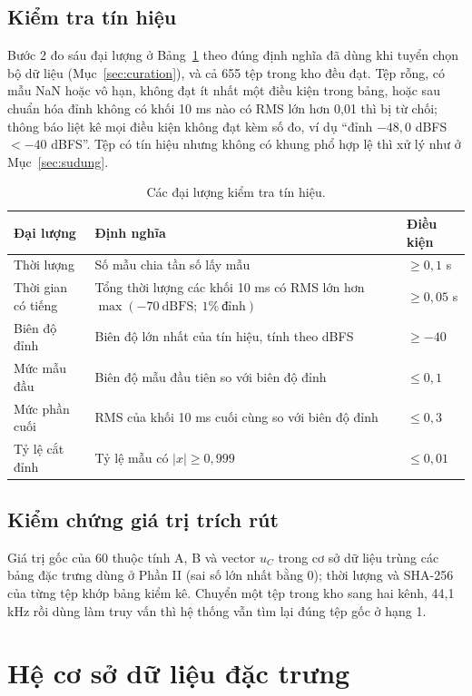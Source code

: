 \documentclass[11pt,a4paper]{article}
\begin{document}
\subsection{Kiểm tra tín hiệu}\label{sec:kiemtratinhieu}
Bước 2 đo sáu đại lượng ở Bảng~\ref{tab:kiemtra} theo đúng định nghĩa đã dùng khi tuyển chọn bộ dữ liệu (Mục~\ref{sec:curation}), và cả 655 tệp trong kho đều đạt. Tệp rỗng, có mẫu NaN hoặc vô hạn, không đạt ít nhất một điều kiện trong bảng, hoặc sau chuẩn hóa đỉnh không có khối 10 ms nào có RMS lớn hơn 0,01 thì bị từ chối; thông báo liệt kê mọi điều kiện không đạt kèm số đo, ví dụ ``đỉnh $-48{,}0$ dBFS $<-40$ dBFS''. Tệp có tín hiệu nhưng không có khung phổ hợp lệ thì xử lý như ở Mục~\ref{sec:sudung}.
\begin{table}[htbp]
\centering\small
\caption{Các đại lượng kiểm tra tín hiệu.}\label{tab:kiemtra}
\begin{tabularx}{\textwidth}{p{}Xl}
\toprule
Đại lượng & Định nghĩa & Điều kiện\\\midrule
Thời lượng & Số mẫu chia tần số lấy mẫu & $\ge 0{,}1$ s\\
Thời gian có tiếng & Tổng thời lượng các khối 10 ms có RMS lớn hơn $\max(-70\ \text{dBFS};\ 1\%\ \text{đỉnh})$ & $\ge 0{,}05$ s\\
Biên độ đỉnh & Biên độ lớn nhất của tín hiệu, tính theo dBFS & $\ge -40$\\
Mức mẫu đầu & Biên độ mẫu đầu tiên so với biên độ đỉnh & $\le 0{,}1$\\
Mức phần cuối & RMS của khối 10 ms cuối cùng so với biên độ đỉnh & $\le 0{,}3$\\
Tỷ lệ cắt đỉnh & Tỷ lệ mẫu có $|x|\ge0{,}999$ & $\le 0{,}01$\\\bottomrule
\end{tabularx}
\end{table}

\subsection{Kiểm chứng giá trị trích rút}
Giá trị gốc của 60 thuộc tính A, B và vector $u_C$ trong cơ sở dữ liệu trùng các bảng đặc trưng dùng ở Phần II (sai số lớn nhất bằng 0); thời lượng và SHA-256 của từng tệp khớp bảng kiểm kê. Chuyển một tệp trong kho sang hai kênh, 44,1 kHz rồi dùng làm truy vấn thì hệ thống vẫn tìm lại đúng tệp gốc ở hạng 1.

\section{Hệ cơ sở dữ liệu đặc trưng}\label{sec:csdl}
\end{document}

